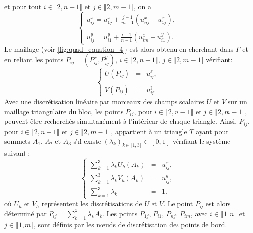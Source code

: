 et pour tout $i\in\llbracket 2, n-1\rrbracket$ et $j\in\llbracket 2, m-1\rrbracket$, on a:
\begin{equation}
\left\{
\begin{array}{ll}
u_{ij}^x=u_{1j}^x+\displaystyle\frac{j-1}{m-1}\left(u_{nj}^x-u_{1j}^x\right),\\\\
u_{ij}^y=u_{i1}^y+\displaystyle\frac{i-1}{n-1}\left(u_{im}^x-u_{i1}^y\right).
\end{array}
\right.
\end{equation}
Le maillage (voir \ref{fig:quad_equation_4}) est alors obtenu en cherchant dans $\Gamma$ et en reliant les points $P_{ij}=(P_{ij}^x, P_{ij}^y)$, $i\in\llbracket 2, n-1\rrbracket$, $j\in\llbracket 2, m-1\rrbracket$ vérifiant:
\begin{equation}
\left\{
\begin{array}{lcl}
U(P_{ij})&=&u_{ij}^x,\\\\
V(P_{ij})&=&u_{ij}^y.
\end{array}
\right.
\end{equation}
Avec une discrétisation linéaire par morceaux des champs scalaires $U$ et $V$ sur un maillage triangulaire du bloc, les points $P_{ij}$, pour $i \in \llbracket 2, n-1 \rrbracket$ et $j \in \llbracket 2, m-1 \rrbracket$, peuvent être recherchés simultanément à l'intérieur de chaque triangle. Ainsi, $P_{ij}$, pour $i \in \llbracket 2, n-1 \rrbracket$ et $j \in \llbracket 2, m-1 \rrbracket$, appartient à un triangle $T$ ayant pour sommets $A_1$, $A_2$ et $A_3$ s'il existe $(\lambda_k)_{k \in \llbracket 1, 3 \rrbracket} \subset [0, 1]$ vérifiant le système suivant :
\begin{equation}
\left\{
\begin{array}{lcl}
\displaystyle\sum_{k=1}^3\lambda_k U_h(A_k) & = & u_{ij}^x,\\
\displaystyle\sum_{k=1}^3\lambda_k V_h(A_k) & = & u_{ij}^y,\\
\displaystyle\sum_{k=1}^3\lambda_k & = & 1.
\end{array}
\right.
\end{equation}
où $U_h$ et $V_h$ représentent les discrétisations de $U$ et $V$. Le point $P_{ij}$ est alors déterminé par $P_{ij}=\sum_{k=1}^3\lambda_kA_k$. Les points $P_{1j}$, $P_{i1}$, $P_{nj}$, $P_{im}$, avec $i \in \llbracket 1, n \rrbracket$ et $j \in \llbracket 1, m \rrbracket$, sont définis par les nœuds de discrétisation des points de bord.
